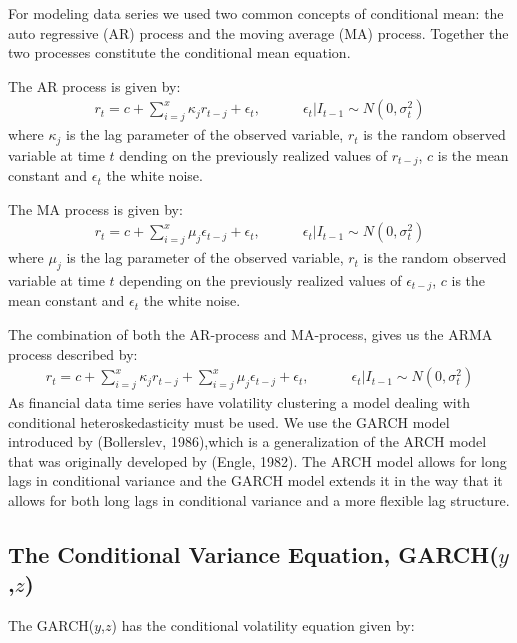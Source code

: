 For modeling data series we used two common concepts of conditional mean: the auto regressive (AR) process and the moving average (MA) process. Together the two processes constitute the conditional mean equation. 

The AR process is given by:
\begin{align}
    r_t=c + \sum_{i=j}^x\kappa_j r_{t-j} + \epsilon_t,\quad\quad\quad \epsilon_t | I_{t-1} \sim N(0,{\sigma_t^2}) \label{ConditionalMeanEquation}
\end{align}
where $\kappa_j$ is the lag parameter of the observed variable, $r_t$ is the random observed variable at time $t$ dending on the previously realized values of $r_{t-j}$, $c$ is the mean constant and $\epsilon_t$ the white noise.

The MA process is given by:
\begin{align}
    r_t=c + \sum_{i=j}^x\mu_j \epsilon_{t-j} + \epsilon_t,\quad\quad\quad \epsilon_t | I_{t-1} \sim N(0,{\sigma_t^2}) \label{ConditionalMeanEquation}
\end{align}
where $\mu_j$ is the lag parameter of the observed variable, $r_t$ is the random observed variable at time $t$ depending on the previously realized values of $\epsilon_{t-j}$, $c$ is the mean constant and $\epsilon_t$ the white noise.

The combination of both the AR-process and MA-process, gives us the ARMA process described by:
\begin{align}
    r_t=c +  \sum_{i=j}^x\kappa_j r_{t-j}+ \sum_{i=j}^x\mu_j \epsilon_{t-j} + \epsilon_t,\quad\quad\quad \epsilon_t | I_{t-1} \sim N(0,{\sigma_t^2}) \label{ConditionalMeanEquation}
\end{align}
As financial data time series have volatility clustering a model dealing with
conditional heteroskedasticity must be used. We use the GARCH model introduced by (Bollerslev, 1986),which is a generalization of the ARCH model that was originally developed by (Engle, 1982). The ARCH model allows for long lags in conditional variance and the GARCH model extends it in the way that it allows for both long lags in conditional variance and a more flexible lag structure.

\subsection*{The Conditional Variance Equation, GARCH($y$,$z$)}

The GARCH($y$,$z$) has the conditional volatility equation given by:

